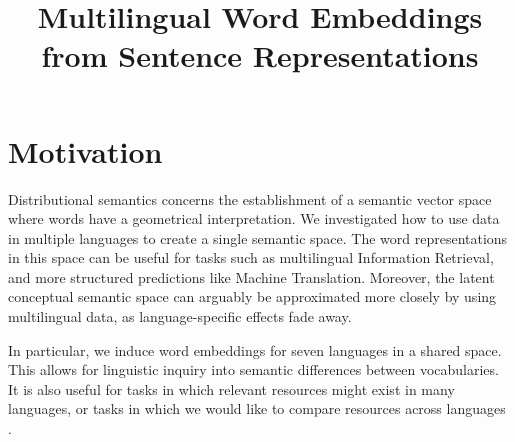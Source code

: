 \documentclass[a4paper,11pt]{article}
\title{Multilingual Word Embeddings from Sentence Representations}
\date{}
\begin{document}
\maketitle
\thispagestyle{empty}
\pagestyle{empty}


\section*{Motivation}



Distributional semantics concerns the establishment of a semantic vector space where words have a geometrical interpretation. We investigated how to use data in multiple languages to create a single semantic space. The word representations in this space can be useful for tasks such as multilingual Information Retrieval, and more structured predictions like Machine Translation. Moreover, the latent conceptual semantic space can arguably be approximated more closely by using multilingual data, as language-specific effects fade away. %

In particular, we induce word embeddings for seven languages in a shared space.  This allows for linguistic inquiry into semantic differences between vocabularies. It is also useful for tasks in which relevant resources might exist in many languages, %
or tasks in which we would like to compare resources across languages%
.

\end{document}
